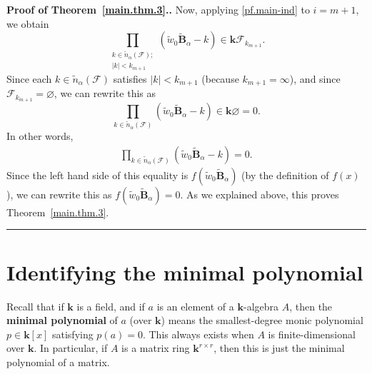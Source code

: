 \documentclass[12pt]{article}
\theoremstyle{definition}%
\theoremstyle{definition}%
\theoremstyle{remark}%
\newcommand{\tup}[1]{\left( #1 \right)}
\newcommand{\sbr}[1]{\left[ #1 \right]} %
\newcommand{\abs}[1]{\left| #1 \right|} %
\newcommand{\kk}{\mathbf{k}}
\newcommand{\ksn}{\kk\left[S_n\right]}
\newcommand{\kf}{\kk\mathcal{F}}
\newcommand{\BBa}{\mathbf{B}_{\alpha}}
\newcommand{\BBta}{\widetilde{\mathbf{B}}_{\alpha}}
\newcommand{\CF}{\mathcal{F}}
\newcommand{\wo}{w_0} %
\newcommand{\wotil}{\widetilde{w}_0}
\newcommand{\nna}{\widetilde{n}_{ \alpha } }%
\newcommand{\defin}[1]{\textbf{#1}}
\newenvironment{proof}[1][Proof]{\noindent\textbf{#1.} }{\ \rule{0.5em}{0.5em}}
\begin{document}
\begin{proof}[Proof of Theorem~\ref{main.thm.3}.]
Now, applying \eqref{pf.main-ind} to $i=m+1$, we obtain
\[
\prod_{\substack{k \in \nna\tup{\CF};\\
\abs{k} <k_{m+1}}} \left(  \wotil\BBta-k\right)
\in \kf_{k_{m+1}}.
\]
Since each $k \in \nna\tup{\CF}$ satisfies $\abs{k} <k_{m+1}$
(because $k_{m+1}=\infty$), and since $\CF_{k_{m+1}}=\varnothing$, we
can rewrite this as
\[
\prod_{k \in \nna\tup{\CF}}\left(  \wotil\BBta-k\right)
\in\kk\varnothing = 0.
\]
In other words,
\begin{align}
\prod_{k \in \nna\tup{\CF}}\left(
\wotil\BBta-k\right)  =0.
\label{pf.eq.main.2.at}
\end{align}
Since the left hand side of this equality is
$f\tup{\wotil \BBta}$ (by the definition of $f\tup{x}$),
we can rewrite this as $f\tup{\wotil \BBta} = 0$.
As we explained above, this proves Theorem~\ref{main.thm.3}.
\end{proof}

\section{\label{sec.minpol}Identifying the minimal polynomial}

Recall that if $\kk$ is a field, and if $a$ is an element of a
$\kk$-algebra $A$, then the \defin{minimal polynomial} of $a$
(over $\kk$) means the smallest-degree monic polynomial
$p \in \kk\sbr{x}$ satisfying $p\tup{a} = 0$.
This always exists when $A$ is finite-dimensional over $\kk$. In
particular, if $A$ is a matrix ring $\kk^{r\times r}$, then this is
just the minimal polynomial of a matrix.
\end{document}

